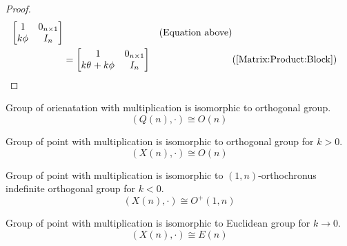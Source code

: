 \documentclass[stu, babel, american, biblatex, a4paper, leqno, draftall]{apa7}
\begin{document}
\begin{proof}
\begin{align*}
\begin{bmatrix}
            1 & 0_{n \times1}          \\
            k\tensor{\phi}{} & I_n \\
        \end{bmatrix} && \text{(Equation above)} \\
        &=
        \begin{bmatrix}
            1 & 0_{n \times1}          \\
            k\tensor{\theta}{}+k\tensor{\phi}{} & I_n \\
        \end{bmatrix} && \text{(\cref{Matrix:Product:Block})}
    \end{align*}
\end{proof}
\begin{proposition}
    Group of orienatation with multiplication is isomorphic to orthogonal group.
    \begin{equation*}
        \left(Q\left(n\right),\cdot\right)\cong O\left(n\right)
    \end{equation*}
\end{proposition}
\begin{proposition}
    Group of point with multiplication is isomorphic to orthogonal group for $k>0$.
    \begin{equation*}
        \left(X\left(n\right),\cdot\right)\cong O\left(n\right)
    \end{equation*}
\end{proposition}
\begin{proposition}
    Group of point with multiplication is isomorphic to $\left(1,n\right)$-orthochronus indefinite orthogonal group for $k<0$.
    \begin{equation*}
        \left(X\left(n\right),\cdot\right)\cong O^+\left(1, n\right)
    \end{equation*}
\end{proposition}
\begin{proposition}
    Group of point with multiplication is isomorphic to Euclidean group for $k\to0$.
    \begin{equation*}
        \left(X\left(n\right),\cdot\right)\cong E\left(n\right)
    \end{equation*}
\end{proposition}
\end{document}
